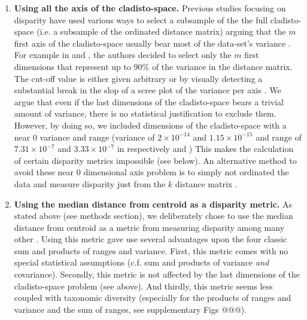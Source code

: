 \documentclass[12pt,letterpaper]{article}
\begin{document}
\begin{enumerate}
    \item \textbf{Using all the axis of the cladisto-space.}
    Previous studies focusing on disparity have used various ways to select a subsample of the the full cladisto-space (i.e. a subsample of the ordinated distance matrix) arguing that the $m$ first axis of the cladisto-space usually bear most of the data-set's variance \citep[e.g][]{brusatte50,cisneros2010,prentice2011,anderson2012using,Hughes20082013,bentonmodels2014}.
    For example in \cite{Brusatte12092008} and \cite{toljagictriassic-jurassic2013}, the authors decided to select only the $m$ first dimensions that represent up to 90\% of the variance in the distance matrix.
    The cut-off value is either given arbitrary or by visually detecting a substantial break in the slop of a scree plot of the variance per axis \citep{Wills1994}.
    We argue that even if the last dimensions of the cladisto-space bears a trivial amount of variance, there is no statistical justification to exclude them.
    However, by doing so, we included dimensions of the cladisto-space with a near 0 variance and range (variance of $2\times10^{-14}$ and $1.15\times10^{-15}$ and range of $7.31\times10^{-7}$ and $3.33\times10^{-7}$ in respectively \citealt{Slater2012MEE} and \citealt{beckancient2014})
    This makes the calculation of certain disparity metrics impossible (see below).
    An alternative method to avoid these near 0 dimensional axis problem is to simply not ordinated the data and measure disparity just from the $k$ distance matrix \citep[e.g.][]{bensonfaunal2014,Close2015}.
    \item \textbf{Using the median distance from centroid as a disparity metric.}    
    As stated above (see methods section), we deliberately chose to use the median distance from centroid as a metric from measuring disparity among many other \citep[e.g.][]{Wills1994,Ciampaglio2004,thorneresetting2011,hopkinsdecoupling2013,huang2015origins}.
    Using this metric gave use several advantages upon the four classic sum and products of ranges and variance.
    First, this metric comes with no special statistical assumptions (c.f. sum and products of variance \textit{and} covariance). %
    Secondly, this metric is not affected by the last dimensions of the cladisto-space problem (see above).
    And thirdly, this metric seems less coupled with taxonomic diversity (especially for the products of ranges and variance and the sum of ranges, see supplementary Figs @@@).

\end{enumerate}
\end{document}
